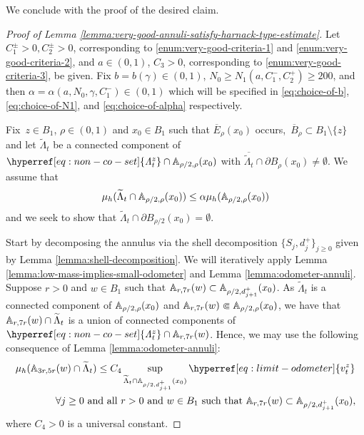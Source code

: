\documentclass[12pt]{amsart}
\numberwithin{equation}{section}
\newcommand{\cluster}[2]{\hyperref[eq:non-co-set]{\mathit{\Lambda}^{#1}_{#2}}}
\newcommand{\odometer}[2]{\hyperref[eq:limit-odometer]{v^{#1}_{#2}}}
\begin{document}
	
	
	
	We conclude with the proof of the desired claim. 
	
	
	
	
	
	\begin{proof}[Proof of Lemma \ref{lemma:very-good-annuli-satisfy-harnack-type-estimate}]
		Let $C^{\pm}_1 > 0, C^{\pm}_2 >0$, corresponding to \ref{enum:very-good-criteria-1} and \ref{enum:very-good-criteria-2},
		and $a \in (0,1)$, $C_3 > 0$, corresponding to \ref{enum:very-good-criteria-3}, be given.  Fix $b = b(\gamma) \in (0,1)$, $N_0 \geq N_1(a,C^-_1, C^+_2) \geq 200$, and then $\alpha = \alpha(a, N_0, \gamma, C^-_1) \in (0,1)$ which will be specified 
		in \eqref{eq:choice-of-b}, \eqref{eq:choice-of-N1}, and \eqref{eq:choice-of-alpha} respectively. 
		
		
		Fix~$z \in B_1$, $\rho \in (0,1)$ and $x_0 \in B_1$ such that $\overline E_\rho(x_0)$ occurs,~$\overline{B}_{\rho} \subset B_1 \setminus \{z\}$ and let $\widetilde \Lambda_t$ be a connected component of ${\cluster{z}{t}} \cap \A_{\rho/2, \rho}(x_0)$ with $\overline{\widetilde \Lambda_t} \cap \partial B_{\rho}(x_0) \neq \emptyset$. We assume that
		\begin{equation} \label{eq:ind-assumption}
		\mu_h(\widetilde{\Lambda}_t \cap \mathbb{A}_{\rho/2, \rho}(x_0)) \leq \alpha \mu_h(\mathbb{A}_{\rho/2, \rho}(x_0)) 
		\end{equation}
		and we seek to show that $\widetilde{\Lambda}_t \cap \partial B_{\rho/2}(x_0) = \emptyset$.
		
		Start by decomposing the annulus via the shell decomposition  $\{S_j, d^+_j\}_{j \geq 0}$ given by Lemma \ref{lemma:shell-decomposition}.
		We will iteratively apply Lemma \ref{lemma:low-mass-implies-small-odometer} and Lemma \ref{lemma:odometer-annuli}. 
		Suppose $r>0$ and $w \in B_1$ such that $\mathbb{A}_{r,7r}(w) \subset \mathbb{A}_{\rho/2, d^+_{j+1}}(x_0)$.
		As $\widetilde \Lambda_t$ is a connected component of $\mathbb{A}_{\rho/2,\rho}(x_0)$ and $\mathbb{A}_{r,7r}(w) \Subset \mathbb{A}_{\rho/2,\rho}(x_0)$, we have that $\mathbb{A}_{r, 7r}(w) \cap \widetilde \Lambda_t$ is a union of connected components of ${\cluster{z}{t}} \cap \A_{r, 7r}(w)$. Hence, we may use the following consequence of Lemma \ref{lemma:odometer-annuli}: 
		\begin{align} \label{eq:small-odometer-implies-low-mass}
		&\mu_h(\A_{3r, 5r}(w) \cap \widetilde \Lambda_t) \leq C_4 \sup_{\widetilde \Lambda_t \cap \A_{\rho/2, d^+_{j+1}}(x_0)} \odometer{z}{t} \notag\\
		&\qquad\qquad \forall j \geq 0 \mbox{ and all $r>0$ and $w\in B_1$ such that } \A_{r, 7r}(w) \subset \A_{\rho/2, d^+_{j+1}}(x_0),
		\end{align}
		where $C_4 > 0$ is a universal constant.
		

\end{proof}
\end{document}
